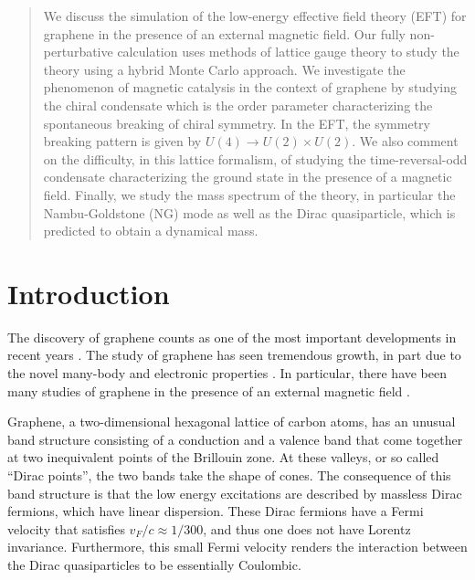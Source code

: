 \documentclass[aps,prd,twocolumn,showpacs,superscriptaddress,groupedaddress]{revtex4}  %
\begin{document}
\begin{abstract}
We discuss the simulation of the low-energy effective field theory (EFT) for graphene in the presence of an external magnetic field. Our fully non-perturbative calculation 
uses methods of lattice gauge theory to study the theory using a hybrid Monte Carlo approach. We investigate the phenomenon of magnetic catalysis in the context of graphene by studying
the chiral condensate which is the order parameter characterizing the spontaneous breaking of chiral symmetry. In the EFT, the symmetry breaking pattern is given by $U(4) \to U(2) \times U(2)$. We also comment on the difficulty, in this lattice formalism, of studying the time-reversal-odd condensate characterizing the ground state in the presence of a magnetic field.
Finally, we study the mass spectrum of the theory, in particular the Nambu-Goldstone (NG) mode as well as the Dirac quasiparticle, which is predicted to obtain a dynamical mass. 
\end{abstract}

\maketitle

\section{\label{sec:Intro}Introduction}
The discovery of graphene counts as one of the most important developments in recent years \cite{Novoselov}. The study of graphene has seen tremendous growth,
in part due to the novel many-body and electronic properties \cite{CastroNeto}. In particular, there have been many studies of graphene
in the presence of an external magnetic field \cite{Goerbig}.

Graphene, a two-dimensional hexagonal lattice of carbon atoms, has an unusual band structure consisting of a conduction and a valence band that come together at two inequivalent points 
of the Brillouin zone. At these valleys, or so called ``Dirac points'', the two bands take the shape of cones. The consequence of this band structure is that the low energy excitations are described by massless Dirac fermions, which have linear dispersion.
These Dirac fermions have a Fermi velocity that satisfies $v_F/c \approx 1/300$, and thus one does not have Lorentz invariance. Furthermore, this small Fermi velocity renders the interaction between the Dirac quasiparticles 
to be essentially Coulombic.
\end{document}
